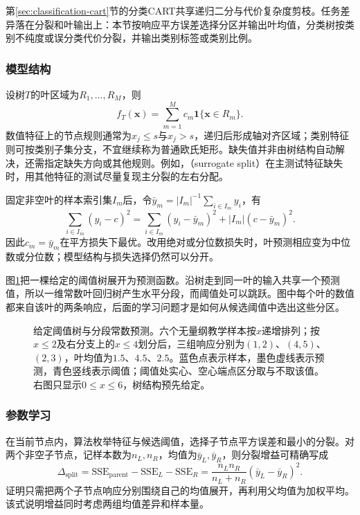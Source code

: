 第\ref{sec:classification-cart}节的分类CART共享递归二分与代价复杂度剪枝。任务差异落在分裂和叶输出上：本节按响应平方误差选择分区并输出叶均值，分类树按类别不纯度或误分类代价分裂，并输出类别标签或类别比例。

\subsubsection{模型结构}

设树$T$的叶区域为$R_1,\ldots,R_M$，则
\begin{equation}
  f_T(\bm{x})=\sum_{m=1}^{M}c_m\mathbf{1}\{\bm{x}\in R_m\}.
  \label{eq:regression-cart-model}
\end{equation}
数值特征上的节点规则通常为$x_j\leq s$与$x_j>s$，递归后形成轴对齐区域；类别特征则可按类别子集分支，不宜继续称为普通欧氏矩形。缺失值并非由树结构自动解决，还需指定缺失方向或其他规则。例如，（surrogate split）在主测试特征缺失时，用其他特征的测试尽量复现主分裂的左右分配。

固定非空叶的样本索引集$I_m$后，令$\bar y_m=|I_m|^{-1}\sum_{i\in I_m}y_i$，有
\[
  \sum_{i\in I_m}(y_i-c)^2
  =\sum_{i\in I_m}(y_i-\bar y_m)^2+|I_m|(c-\bar y_m)^2.
\]
因此$c_m=\bar y_m$在平方损失下最优。改用绝对或分位数损失时，叶预测相应变为中位数或分位数；模型结构与损失选择仍然可以分开。

图\ref{fig:regression-tree-prediction}把一棵给定的阈值树展开为预测函数。沿树走到同一叶的输入共享一个预测值，所以一维常数叶回归树产生水平分段，而阈值处可以跳跃。图中每个叶的数值都来自该叶的两条响应，后面的学习问题才是如何从候选阈值中选出这些分区。

\begin{figure}[t]
  \centering
  
  \caption{给定阈值树与分段常数预测。六个无量纲教学样本按$x$递增排列；按$x\leq2$及右分支上的$x\leq4$划分后，三组响应分别为$(1,2)$、$(4,5)$、$(2,3)$，叶均值为$1.5$、$4.5$、$2.5$。蓝色点表示样本，墨色虚线表示预测，青色竖线表示阈值；阈值处实心、空心端点区分取与不取该值。右图只显示$0\leq x\leq6$，树结构预先给定。}
  \label{fig:regression-tree-prediction}
\end{figure}

\subsubsection{参数学习}
\label{sec:regression-cart-learning}

在当前节点内，算法枚举特征与候选阈值，选择子节点平方误差和最小的分裂。对两个非空子节点，记样本数为$n_L,n_R$，均值为$\bar y_L,\bar y_R$，则分裂增益可精确写成
\begin{equation}
  \Delta_{\mathrm{split}}
  =\mathrm{SSE}_{\mathrm{parent}}
    -\mathrm{SSE}_{L}-\mathrm{SSE}_{R}
  =\frac{n_Ln_R}{n_L+n_R}(\bar y_L-\bar y_R)^2.
  \label{eq:regression-cart-gain}
\end{equation}
证明只需把两个子节点响应分别围绕自己的均值展开，再利用父均值为加权平均。该式说明增益同时考虑两组均值差异和样本量。

